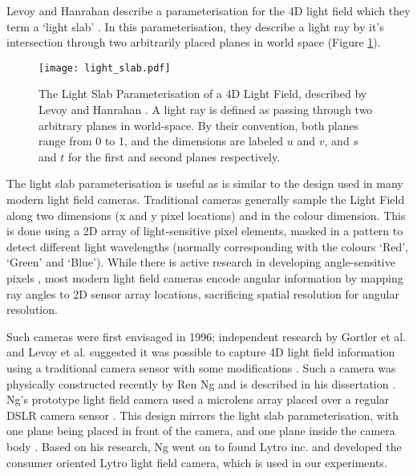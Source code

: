 Levoy and Hanrahan describe a parameterisation for the 4D light field which they term a \enquote*{light slab} \cite{levoy1996light}.
In this parameterisation, they describe a light ray by it's intersection through two arbitrarily placed planes in world space (Figure \ref{fig:light_slab}).

\begin{figure}[h]
\centering
\texttt{[image: light\_slab.pdf]}
\caption[The Light Slab Parameterisation of a 4D Light Field]{
The Light Slab Parameterisation of a 4D Light Field, described by Levoy and Hanrahan \cite{levoy1996light}.
A light ray is defined as passing through two arbitrary planes in world-space.
By their convention, both planes range from 0 to 1, and the dimensions are labeled $u$ and $v$, and $s$ and $t$ for the first and second planes respectively.
}
\label{fig:light_slab}
\end{figure}

The light slab parameterisation is useful as is similar to the design used in many modern light field cameras.
Traditional cameras generally sample the Light Field along two dimensions (x and y pixel locations) and in the colour dimension.
This is done using a 2D array of light-sensitive pixel elements, masked in a pattern to detect different light wavelengths (normally corresponding with the colours \enquote*{Red}, \enquote*{Green} and \enquote*{Blue}).
While there is active research in developing angle-sensitive pixels \cite{wang2009angle, wang2011angle, wang2012angle}, most modern light field cameras encode angular information by mapping ray angles to 2D sensor array locations, sacrificing spatial resolution for angular resolution.

Such cameras were first envisaged in 1996; independent research by Gortler et al. and Levoy et al. suggested it was possible to capture 4D light field information using a traditional camera sensor with some modifications \cite{gortler1996lumigraph, levoy1996light}.
Such a camera was physically constructed recently by Ren Ng and is described in his dissertation \cite{ng2006digital}.
Ng's prototype light field camera used a microlens array placed over a regular DSLR camera sensor \cite{ng2006digital}.
This design mirrors the light slab parameterisation, with one plane being placed in front of the camera, and one plane inside the camera body \cite{dansereau2013plenoptic}.
Based on his research, Ng went on to found Lytro inc. and developed the consumer oriented Lytro light field camera, which is used in our experiments.

